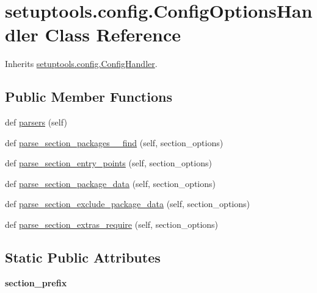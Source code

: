 \hypertarget{classsetuptools_1_1config_1_1_config_options_handler}{}\section{setuptools.\+config.\+Config\+Options\+Handler Class Reference}
\label{classsetuptools_1_1config_1_1_config_options_handler}


Inherits \hyperlink{classsetuptools_1_1config_1_1_config_handler}{setuptools.\+config.\+Config\+Handler}.

\subsection*{Public Member Functions}
\begin{DoxyCompactItemize}
\item 
def \hyperlink{classsetuptools_1_1config_1_1_config_options_handler_a84db64d7a8a64c2816c2967a1ba1a486}{parsers} (self)
\item 
def \hyperlink{classsetuptools_1_1config_1_1_config_options_handler_afed6ee3f1ec81344d74bdf4628e4c46c}{parse\+\_\+section\+\_\+packages\+\_\+\+\_\+find} (self, section\+\_\+options)
\item 
def \hyperlink{classsetuptools_1_1config_1_1_config_options_handler_a42f9e236b47d3cb64aceca12f78e2d03}{parse\+\_\+section\+\_\+entry\+\_\+points} (self, section\+\_\+options)
\item 
def \hyperlink{classsetuptools_1_1config_1_1_config_options_handler_a14aebb7fdf19d03ea94d3d95aa6d7c78}{parse\+\_\+section\+\_\+package\+\_\+data} (self, section\+\_\+options)
\item 
def \hyperlink{classsetuptools_1_1config_1_1_config_options_handler_ad44f789fc34004eebe3e5550f185c07b}{parse\+\_\+section\+\_\+exclude\+\_\+package\+\_\+data} (self, section\+\_\+options)
\item 
def \hyperlink{classsetuptools_1_1config_1_1_config_options_handler_adb5582b20141d7b4439ea1e6cab8ddcc}{parse\+\_\+section\+\_\+extras\+\_\+require} (self, section\+\_\+options)
\end{DoxyCompactItemize}
\subsection*{Static Public Attributes}
\begin{DoxyCompactItemize}
\item 
\mbox{\label{classsetuptools_1_1config_1_1_config_options_handler_aa0d0e8dc8dd85ccce427a87a558f322e}} 
{\bfseries section\+\_\+prefix}
\end{DoxyCompactItemize}
